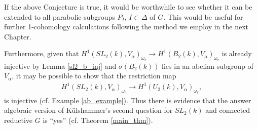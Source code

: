 If the above Conjecture is true, it would be worthwhile to see whether it can be extended to all parabolic subgroups $P_I$, $I\subset \Delta$ of $G$. This would be useful for further 1-cohomology calculations following the method we employ in the next Chapter.

Furthermore, given that $H^1(SL_2(k), V_\alpha)_{\omega_r}\rightarrow H^1(B_2(k), V_\alpha)_{\omega_r}$ is already injective by Lemma \ref{sl2_b_inj} and $\sigma\left(B_2(k)\right)$ lies in an abelian subgroup of $V_\alpha$, it may be possible to show that the restriction map
\begin{align*}
	H^1(SL_2(k), V_\alpha)_{\omega_r} \rightarrow H^1(U_2(k), V_\alpha)_{\omega_r},
\end{align*}
is injective (cf. Example \ref{ab_example}). Thus there is evidence that the answer algebraic version of K\"ulshammer's second question for $SL_2(k)$ and connected reductive $G$ is ``yes'' (cf. Theorem \ref{main_thm}).
